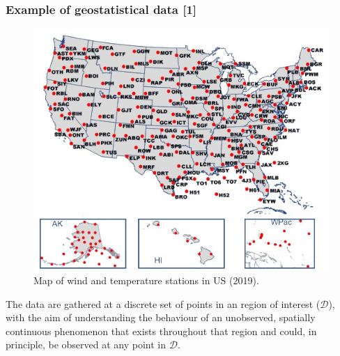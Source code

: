 \documentclass[12pt]{beamer}
\begin{document}
\begin{frame}
\frametitle{Example of geostatistical data [1]}
\begin{figure}
\includegraphics[scale=0.60]{Figures/Wind_Temp_StationsUS.jpg}
\caption{\footnotesize Map of wind and temperature stations in US (2019).}
\end{figure}
\footnotesize The data are gathered at a discrete set of points in an region of interest ($\mathcal{D}$), with the aim of understanding
the behaviour of an unobserved, spatially continuous phenomenon that exists throughout that region and could, in principle, be observed at any point in $\mathcal{D}$.
\end{frame}
\end{document}
